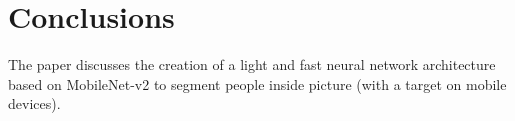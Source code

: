 \section{Conclusions}

The paper discusses the creation of a light and fast neural network architecture based on MobileNet-v2 to segment people inside picture (with a target on mobile devices).
